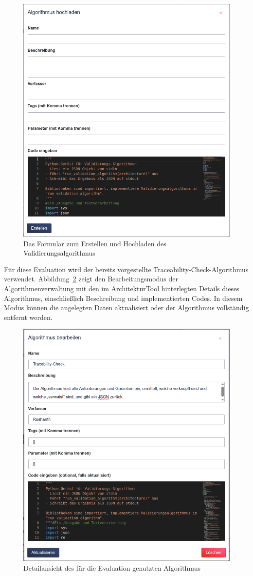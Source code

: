 \begin{figure}[h!]
  \centering
  \includegraphics[width=.5\textwidth]{figures/06Evaluation/Bildschirmfoto vom 2025-08-01 11-36-46.png}
  \caption{Das Formular zum Erstellen und Hochladen des Validierungsalgorithmus}
  \label{fig:formularclean}
\end{figure}

Für diese Evaluation wird der bereits vorgestellte Traceability-Check-Algorithmus verwendet. Abbildung~\ref{fig:formularfilled} zeigt den Bearbeitungsmodus der Algorithmenverwaltung mit den im ArchitekturTool hinterlegten Details dieses Algorithmus, einschließlich Beschreibung und implementierten Codes. In diesem Modus können die angelegten Daten aktualisiert oder der Algorithmus vollständig entfernt werden.

\begin{figure}[htp!]
  \centering
  \includegraphics[width=.5\textwidth]{figures/06Evaluation/Bildschirmfoto vom 2025-08-01 11-58-21.png}
  \caption{Detailansicht des für die Evaluation genutzten Algorithmus}
  \label{fig:formularfilled}
\end{figure}

